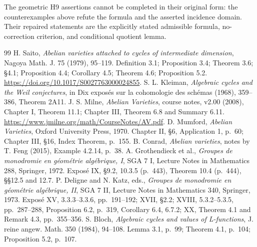 \documentclass[11pt,a4paper]{article}
\begin{document}
The geometric H9 assertions cannot be completed in their original form:
the counterexamples above refute the formula and the asserted incidence
domain. Their repaired statements are the explicitly stated admissible
formula, no-correction criterion, and conditional quotient lemma.
\begin{thebibliography}{99}
 H. Saito, \emph{Abelian varieties attached to cycles of intermediate dimension}, Nagoya Math. J. 75 (1979), 95--119. Definition 3.1; Proposition 3.4; Theorem 3.6; \S4.1; Proposition 4.4; Corollary 4.5; Theorem 4.6; Proposition 5.2. \url{https://doi.org/10.1017/S0027763000024855}.
 S. L. Kleiman, \emph{Algebraic cycles and the Weil conjectures}, in Dix expos\'es sur la cohomologie des sch\'emas (1968), 359--386, Theorem 2A11.
 J. S. Milne, \emph{Abelian Varieties}, course notes, v2.00 (2008), Chapter I, Theorem 11.1; Chapter III, Theorem 6.8 and Summary 6.11. \url{https://www.jmilne.org/math/CourseNotes/AV.pdf}.
 D. Mumford, \emph{Abelian Varieties}, Oxford University Press, 1970. Chapter II, \S6, Application 1, p.~60; Chapter III, \S16, Index Theorem, p.~155.
 B. Conrad, \emph{Abelian varieties}, notes by T. Feng (2015), Example 4.2.14, p.~38.
 A. Grothendieck et al., \emph{Groupes de monodromie en g\'eom\'etrie alg\'ebrique, I}, SGA 7 I, Lecture Notes in Mathematics 288, Springer, 1972. Expos\'e IX, \S9.2, 10.3.5 (p.~443), Theorem 10.4 (p.~444), \S\S12.5 and 12.7.
 P. Deligne and N. Katz, eds., \emph{Groupes de monodromie en g\'eom\'etrie alg\'ebrique, II}, SGA 7 II, Lecture Notes in Mathematics 340, Springer, 1973. Expos\'e XV, 3.3.3--3.3.6, pp.~191--192; XVII, \S2.2; XVIII, 5.3.2--5.3.5, pp.~287--288, Proposition 6.2, p.~319, Corollary 6.4, 6.7.2; XX, Theorem 4.1 and Remark 4.3, pp.~355--356.
 S. Bloch, \emph{Algebraic cycles and values of L-functions}, J. reine angew. Math. 350 (1984), 94--108. Lemma 3.1, p.~99; Theorem 4.1, p.~104; Proposition 5.2, p.~107.
\end{thebibliography}
\end{document}
